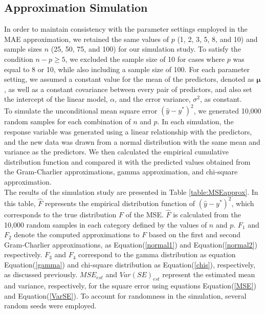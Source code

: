 \subsection{Approximation Simulation}

In order to maintain consistency with the parameter settings employed in the MAE approximation, we retained the same values of $p$ (1, 2, 3, 5, 8, and 10) and sample sizes $n$ (25, 50, 75, and 100) for our simulation study. To satisfy the condition $n-p \geq 5$, we excluded the sample size of 10 for cases where $p$ was equal to 8 or 10, while also including a sample size of 100. For each parameter setting, we assumed a constant value for the mean of the predictors, denoted as $\boldsymbol{\mu}$, as well as a constant covariance between every pair of predictors, and also set the intercept of the linear model, $\alpha$, and the error variance, $\sigma^2$, as constant.\\

To simulate the unconditional mean square error $(\hat{y}-y^*)^2$, we generated 10,000 random samples for each combination of $n$ and $p$. In each simulation, the response variable was generated using a linear relationship with the predictors, and the new data was drawn from a normal distribution with the same mean and variance as the predictors. We then calculated the empirical cumulative distribution function and compared it with the predicted values obtained from the Gram-Charlier approximations, gamma approximation, and chi-square approximation.
\\

The results of the simulation study are presented in Table \ref{table:MSEapprox}. In this table, $\hat{F}$ represents the empirical distribution function of $(\hat{y}-y^*)^2$, which corresponds to the true distribution $F$ of the MSE. $\hat{F}$ is calculated from the 10,000 random samples in each category defined by the values of $n$ and $p$. $F_1$ and $F_2$ denote the computed approximations to $F$ based on the first and second Gram-Charlier approximations, as Equation(\ref{normal1}) and Equation(\ref{normal2}) respectively. $F_3$ and $F_4$ correspond to the gamma distribution as equation Equation(\ref{gamma}) and chi-square distribution as Equation(\ref{chis}), respectively, as discussed previously. $MSE_{est}$ and $Var(SE)_{est}$ represent the estimated mean and variance, respectively, for the square error using equations Equation(\ref{MSE}) and Equation(\ref{VarSE}). To account for randomness in the simulation, several random seeds were employed.

